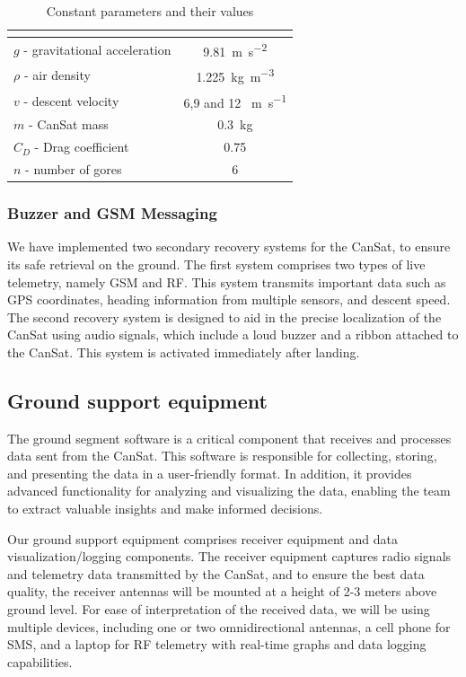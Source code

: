 \documentclass[11pt]{article}
\begin{document}
\begin{table}[htbp]
\centering
{}
\begin{tabular}{>{\centering\arraybackslash}lc}
\rowcolor{DeepSkyBlue4}
\hline
\multicolumn{1}{|c|}{\textbf{\color{white!50}{Parameter}}}  & \textbf{\color{white!50}{Value}} \\
\hline
$g$ - gravitational acceleration & \SI{9.81 }{\meter\per\square\second} \\
\rowcolor{LightCyan1!50}$\rho$ - air density & \SI{1.225}{\kilogram\per\cubic\metre} \\
$v$ - descent velocity & 6,9 and 12 \SI{}{\meter\per\second} \\
\rowcolor{LightCyan1!50}$m$ - CanSat mass & \SI{0.3}{\kilogram} \\
$C_D$ - Drag coefficient & 0.75 \\
\rowcolor{LightCyan1!50}$n$ - number of gores & 6 \\
\hline
\end{tabular}
\caption{Constant parameters and their values}
\end{table}

\subsubsection{Buzzer and GSM Messaging}
We have implemented two secondary recovery systems for the CanSat, to ensure its safe retrieval on the ground. The first system comprises two types of live telemetry, namely GSM and RF. This system transmits important data such as GPS coordinates, heading information from multiple sensors, and descent speed. The second recovery system is designed to aid in the precise localization of the CanSat using audio signals, which include a loud buzzer and a ribbon attached to the CanSat. This system is activated immediately after landing.

\subsection{Ground support equipment}
The ground segment software is a critical component that receives and processes data sent from the CanSat. This software is responsible for collecting, storing, and presenting the data in a user-friendly format. In addition, it provides advanced functionality for analyzing and visualizing the data, enabling the team to extract valuable insights and make informed decisions.

Our ground support equipment comprises receiver equipment and data visualization/logging components. The receiver equipment captures radio signals and telemetry data transmitted by the CanSat, and to ensure the best data quality, the receiver antennas will be mounted at a height of 2-3 meters above ground level. For ease of interpretation of the received data, we will be using multiple devices, including one or two omnidirectional antennas, a cell phone for SMS, and a laptop for RF telemetry with real-time graphs and data logging capabilities.
\end{document}
